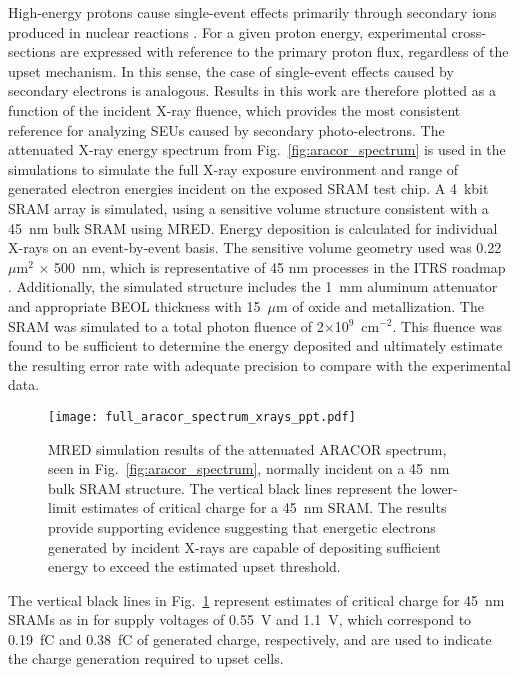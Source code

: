 High-energy protons cause single-event effects primarily through secondary ions produced in nuclear reactions \cite{Heidel:2006tp,Heidel:2008vf,Heidel:2009vx,Rodbell:2007vl}. 
For a given proton energy, experimental cross-sections are expressed with reference to the primary proton flux, regardless of the upset mechanism. 
In this sense, the case of single-event effects caused by secondary electrons is analogous. 
Results in this work are therefore plotted as a function of the incident X-ray fluence, which provides the most consistent reference for analyzing SEUs caused by secondary photo-electrons.
The attenuated X-ray energy spectrum from Fig.~\ref{fig:aracor_spectrum} is used in the simulations to simulate the full X-ray exposure environment and range of generated electron energies incident on the exposed SRAM test chip. 
A 4~kbit SRAM array is simulated, using a sensitive volume structure consistent with a 45~nm bulk SRAM using MRED.
Energy deposition is calculated for individual X-rays on an event-by-event basis.
The sensitive volume geometry used was 0.22~$\mu$m$^2$ $\times$ 500~nm, which is representative of 45 nm processes in the ITRS roadmap \cite{itrs:2012}. 
Additionally, the simulated structure includes the 1~mm aluminum attenuator and appropriate BEOL thickness with 15~$\mu$m of oxide and metallization. 
The SRAM was simulated to a total photon fluence of 2$\times$10$^9$~cm$^{-2}$.
This fluence was found to be sufficient to determine the energy deposited and ultimately estimate the resulting error rate with adequate precision to compare with the experimental data. 
\begin{figure}[tb]
   \centering
       \texttt{[image: full\_aracor\_spectrum\_xrays\_ppt.pdf]}
   \caption{MRED simulation results of the attenuated ARACOR spectrum, seen in Fig.~\ref{fig:aracor_spectrum}, normally incident on a 45~nm bulk SRAM structure. The vertical black lines represent the lower-limit estimates of critical charge for a 45~nm SRAM. The results provide supporting evidence suggesting that energetic electrons generated by incident X-rays are capable of depositing sufficient energy to exceed the estimated upset threshold.}
   \label{fig:50kev_xrays_ppt}
\end{figure}
The vertical black lines in Fig.~\ref{fig:50kev_xrays_ppt} represent estimates of critical charge for 45~nm SRAMs as in \cite{King:2010cu} for supply voltages of 0.55~V and 1.1~V, which correspond to 0.19~fC and 0.38~fC of generated charge, respectively, and are used to indicate the charge generation required to upset cells.

